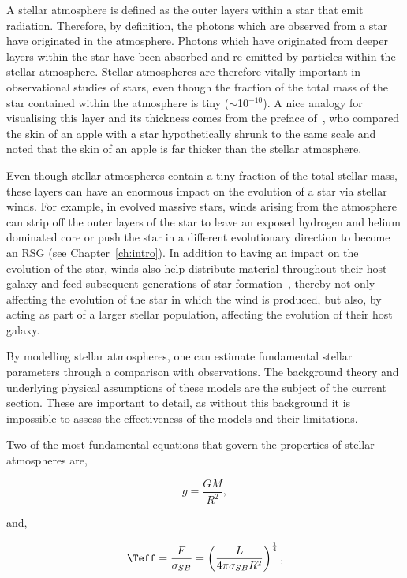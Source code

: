 A stellar atmosphere is defined as the outer layers within a star that emit radiation.
Therefore, by definition, the photons which are observed from a star have originated in the atmosphere.
Photons which have originated from deeper layers within the star have been absorbed and re-emitted by particles within the stellar atmosphere.
Stellar atmospheres are therefore vitally important in observational studies of stars, even though the fraction of the total mass of the star contained within the atmosphere is tiny ($\sim$10$^{-10}$).
A nice analogy for visualising this layer and its thickness comes from the preface of~\cite{1989isa2.book.....B}, who compared the skin of an apple with a star hypothetically shrunk to the same scale and noted that the skin of an apple is far thicker than the stellar atmosphere.


Even though stellar atmospheres contain a tiny fraction of the total stellar mass, these layers can have an enormous impact on the evolution of a star via stellar winds.
For example, in evolved massive stars, winds arising from the atmosphere can strip off the outer layers of the star to leave an exposed hydrogen and helium dominated core or push the star in a different evolutionary direction to become an RSG (see Chapter~\ref{ch:intro}).
In addition to having an impact on the evolution of the star, winds also help distribute material throughout their host galaxy and feed subsequent generations of star formation~\citep[e.g.][]{2011MNRAS.417..950H,2012MNRAS.421.3522H}, thereby not only affecting the evolution of the star in which the wind is produced, but also, by acting as part of a larger stellar population, affecting the evolution of their host galaxy.

By modelling stellar atmospheres, one can estimate fundamental stellar parameters through a comparison with observations.
The background theory and underlying physical assumptions of these models are the subject of the current section.
These are important to detail, as without this background it is impossible to assess the effectiveness of the models and their limitations.

Two of the most fundamental equations that govern the properties of stellar atmospheres are,

\begin{equation}
    g = \frac{GM}{R^2},\label{eq:grav}
\end{equation}

and,

\begin{equation}
    \Teff = \frac{F}{\sigma_{SB}} = \left(\frac{L}{4\pi \sigma_{SB}R^2}\right)^\frac{1}{4},\label{eq:Teff}
\end{equation}

